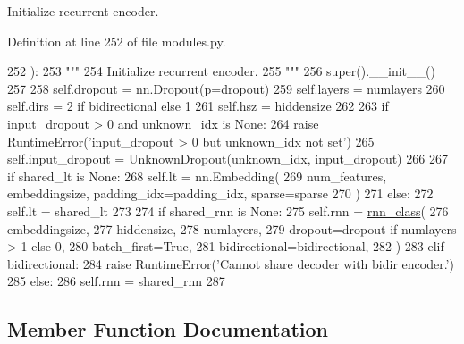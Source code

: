 \begin{DoxyVerb}Initialize recurrent encoder.
\end{DoxyVerb}
 

Definition at line 252 of file modules.\+py.


\begin{DoxyCode}
252     ):
253         \textcolor{stringliteral}{"""}
254 \textcolor{stringliteral}{        Initialize recurrent encoder.}
255 \textcolor{stringliteral}{        """}
256         super().\_\_init\_\_()
257 
258         self.dropout = nn.Dropout(p=dropout)
259         self.layers = numlayers
260         self.dirs = 2 \textcolor{keywordflow}{if} bidirectional \textcolor{keywordflow}{else} 1
261         self.hsz = hiddensize
262 
263         \textcolor{keywordflow}{if} input\_dropout > 0 \textcolor{keywordflow}{and} unknown\_idx \textcolor{keywordflow}{is} \textcolor{keywordtype}{None}:
264             \textcolor{keywordflow}{raise} RuntimeError(\textcolor{stringliteral}{'input\_dropout > 0 but unknown\_idx not set'})
265         self.input\_dropout = UnknownDropout(unknown\_idx, input\_dropout)
266 
267         \textcolor{keywordflow}{if} shared\_lt \textcolor{keywordflow}{is} \textcolor{keywordtype}{None}:
268             self.lt = nn.Embedding(
269                 num\_features, embeddingsize, padding\_idx=padding\_idx, sparse=sparse
270             )
271         \textcolor{keywordflow}{else}:
272             self.lt = shared\_lt
273 
274         \textcolor{keywordflow}{if} shared\_rnn \textcolor{keywordflow}{is} \textcolor{keywordtype}{None}:
275             self.rnn = \hyperlink{namespaceseq2seq_1_1train_a1b062073c766f1d34a67f572ef256ba0}{rnn\_class}(
276                 embeddingsize,
277                 hiddensize,
278                 numlayers,
279                 dropout=dropout \textcolor{keywordflow}{if} numlayers > 1 \textcolor{keywordflow}{else} 0,
280                 batch\_first=\textcolor{keyword}{True},
281                 bidirectional=bidirectional,
282             )
283         \textcolor{keywordflow}{elif} bidirectional:
284             \textcolor{keywordflow}{raise} RuntimeError(\textcolor{stringliteral}{'Cannot share decoder with bidir encoder.'})
285         \textcolor{keywordflow}{else}:
286             self.rnn = shared\_rnn
287 
\end{DoxyCode}


\subsection{Member Function Documentation}
\mbox{\label{classparlai_1_1agents_1_1seq2seq_1_1modules_1_1RNNEncoder_a4ae3d043b7a381e0eb89eb5460217029}} 
